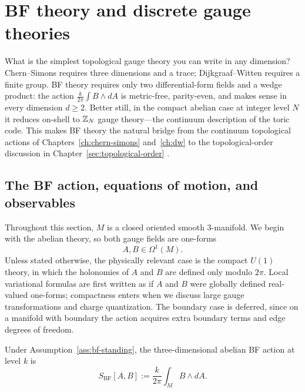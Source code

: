 \chapter{BF theory and discrete gauge theories}\label{ch:bf}

What is the simplest topological gauge theory you can write in any dimension?  Chern--Simons requires three dimensions and a trace; Dijkgraaf--Witten requires a finite group.  BF theory requires only two differential-form fields and a wedge product: the action $\frac{k}{2\pi}\int B\wedge dA$ is metric-free, parity-even, and makes sense in every dimension $d \geq 2$.  Better still, in the compact abelian case at integer level $N$ it reduces on-shell to $\mathbb{Z}_N$ gauge theory---the continuum description of the toric code.  This makes BF theory the natural bridge from the continuum topological actions of Chapters~\ref{ch:chern-simons} and~\ref{ch:dw} to the topological-order discussion in Chapter~\ref{sec:topological-order} \cite{Horowitz1989,BlauThompson1991}.

\section{The BF action, equations of motion, and observables}\label{sec:bf-action}

\begin{assumption}\label{ass:bf-standing}
Throughout this section, $M$ is a closed oriented smooth $3$-manifold. We begin with the abelian theory, so both gauge fields are one-forms
\begin{equation*}
A,B \in \Omega^1(M).
\end{equation*}
Unless stated otherwise, the physically relevant case is the compact $U(1)$ theory, in which the holonomies of $A$ and $B$ are defined only modulo $2\pi$. Local variational formulas are first written as if $A$ and $B$ were globally defined real-valued one-forms; compactness enters when we discuss large gauge transformations and charge quantization. The boundary case is deferred, since on a manifold with boundary the action acquires extra boundary terms and edge degrees of freedom.
\end{assumption}

\begin{definition}\label{def:bf-action}
Under Assumption~\ref{ass:bf-standing}, the three-dimensional abelian BF action at level $k$ is
\begin{equation}\label{eq:bf-action}
S_{\mathrm{BF}}[A,B]
:=
\frac{k}{2\pi}\int_M B\wedge dA.
\end{equation}
\end{definition}

